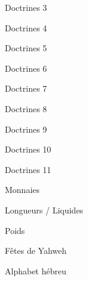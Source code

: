 \documentclass[10pt]{book}
\begin{document}
\begin{spacing}{0.8}
\begin{center}Doctrines 3\end{center}\clearpage
\begin{center}Doctrines 4\end{center}\clearpage
\begin{center}Doctrines 5\end{center}\clearpage
\begin{center}Doctrines 6\end{center}\clearpage
\begin{center}Doctrines 7\end{center}\clearpage
\begin{center}Doctrines 8\end{center}\clearpage
\begin{center}Doctrines 9\end{center}\clearpage
\begin{center}Doctrines 10\end{center}\clearpage
\begin{center}Doctrines 11\end{center}\clearpage
{}\clearpage
\begin{center}Monnaies\end{center}\clearpage
{}\clearpage
\begin{center}Longueurs / Liquides\end{center}\clearpage
{}\clearpage
\begin{center}Poids\end{center}\clearpage
{}\clearpage
\begin{center}Fêtes de Yahweh\end{center}\clearpage
{}\clearpage
\begin{center}Alphabet hébreu\end{center}\clearpage
\end{spacing}
\end{document}
